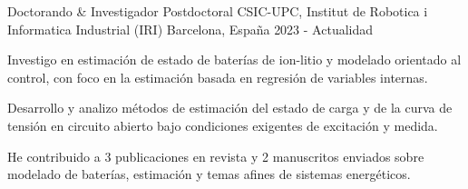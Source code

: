 \cventry
  {Doctorando \& Investigador Postdoctoral}
  {CSIC-UPC, Institut de Robotica i Informatica Industrial (IRI)}
  {Barcelona, Espa\~na}
  {2023 - Actualidad}
  {
    \begin{cvitems}
      \item {Investigo en estimaci\'on de estado de bater\'ias de ion-litio y modelado orientado al control, con foco en la estimaci\'on basada en regresi\'on de variables internas.}
      \item {Desarrollo y analizo m\'etodos de estimaci\'on del estado de carga y de la curva de tensi\'on en circuito abierto bajo condiciones exigentes de excitaci\'on y medida.}
      \item {He contribuido a 3 publicaciones en revista y 2 manuscritos enviados sobre modelado de bater\'ias, estimaci\'on y temas afines de sistemas energ\'eticos.}
    \end{cvitems}
  }
